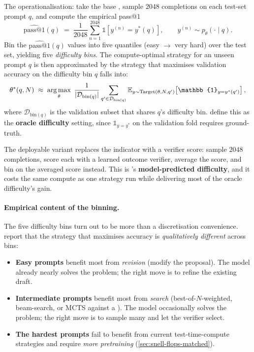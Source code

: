 The operationalisation: take the base , sample $2048$ completions on
each test-set prompt $q$, and compute the empirical pass@$1$
\begin{equation}
  \widehat{\mathrm{pass@}1}(q)
    \;=\; \frac{1}{2048}\sum_{n=1}^{2048}\mathbb{1}\!\left[y^{(n)} = y^\ast(q)\right],
    \qquad y^{(n)} \sim p_\theta(\cdot \mid q).
  \label{eq:pass-at-1-binning}
\end{equation}
Bin the $\widehat{\mathrm{pass@}1}(q)$ values into five quantiles
(easy $\to$ very hard) over the test set, yielding five
\emph{difficulty bins}. The compute-optimal strategy for an unseen
prompt $q$ is then approximated by the strategy that maximises
validation accuracy on the difficulty bin $q$ falls into:
\begin{equation}
  \theta^\ast(q, N)
    \;\approx\;
    \argmax_\theta \;
    \frac{1}{|\mathcal{D}_{\mathrm{bin}(q)}|}
    \sum_{q' \in \mathcal{D}_{\mathrm{bin}(q)}}
    \E_{y \sim \mathrm{Target}(\theta, N, q')}\!\left[\mathbb{1}_{y = y^\ast(q')}\right],
  \label{eq:snell-bin-argmax}
\end{equation}
where $\mathcal{D}_{\mathrm{bin}(q)}$ is the validation subset that
shares $q$'s difficulty bin. \citet[\S 3.2]{snell2024} define this as
the \textbf{oracle difficulty} setting, since $\mathbb{1}_{y = y^\ast}$
on the validation fold requires ground-truth.

The deployable variant replaces the indicator with a verifier score:
sample $2048$ completions, score each with a learned outcome verifier,
average the score, and bin on the averaged score instead. This is
\citet[\S 3.2]{snell2024}'s \textbf{model-predicted difficulty}, and it
costs the same compute as one strategy run while delivering most of the
oracle difficulty's gain.

\paragraph{Empirical content of the binning.} The five difficulty bins
turn out to be more than a discretisation convenience.
\citet[\S 3.2]{snell2024} report that the strategy that maximises
accuracy is \emph{qualitatively different} across bins:
\begin{itemize}
\item \textbf{Easy prompts} benefit most from \emph{revision} (modify
the proposal). The model already nearly solves the problem; the right
move is to refine the existing draft.
\item \textbf{Intermediate prompts} benefit most from \emph{search}
(best-of-$N$-weighted, beam-search, or MCTS against a 
\citep[\S 5.2]{snell2024}). The model occasionally solves the problem;
the right move is to sample many and let the verifier select.
\item \textbf{The hardest prompts} fail to benefit from current
test-time-compute strategies and require \emph{more pretraining}
(\cref{sec:snell-flops-matched}).
\end{itemize}

